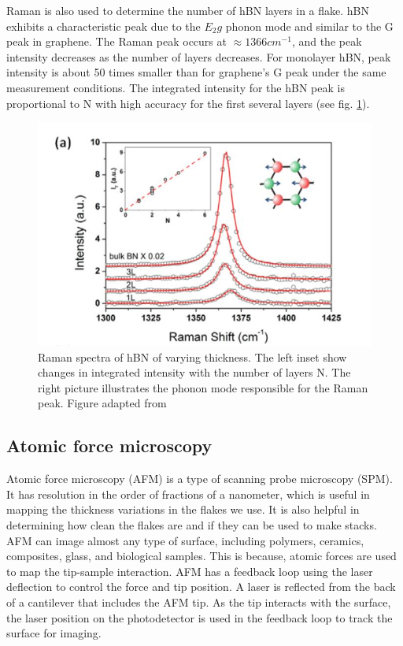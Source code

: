 Raman is also used to determine the number of hBN layers in a flake. hBN exhibits a characteristic peak due to the $E_2g$ phonon mode and similar to the G peak in graphene. The Raman peak occurs at $\approx1366 cm^{-1}$, and the peak intensity decreases as the number of layers decreases. \cite{Peter} For monolayer hBN, peak intensity is about 50 times smaller than for graphene’s G peak under the same measurement conditions. The integrated intensity for the hBN peak is proportional to N with high accuracy for the first several layers (see fig. \ref{fig:raman_hbn}).

\begin{figure}[H]
	\centering
	\includegraphics[width=0.7\linewidth]{figures/raman_hbn}
	\caption{Raman spectra of hBN of varying thickness. The left inset show changes in integrated intensity with the number of layers N. The right picture illustrates the phonon mode responsible for the Raman peak. Figure adapted from \cite{Peter}}
	\label{fig:raman_hbn}
\end{figure}

\subsection{Atomic force microscopy}

Atomic force microscopy (AFM) is a type of scanning probe microscopy (SPM). It has resolution in the order of fractions of a nanometer, which is useful in mapping the thickness variations in the flakes we use. It is also helpful in determining how clean the flakes are and if they can be used to make stacks. AFM can image almost any type of surface, including polymers, ceramics, composites, glass, and biological samples. This is because, atomic forces are used to map the tip-sample interaction. AFM has a feedback loop using the laser deflection to control the force and tip position. A laser is reflected from the back of a cantilever that includes the AFM tip. As the tip interacts with the surface, the laser position on the photodetector is used in the feedback loop to track the surface for imaging.

